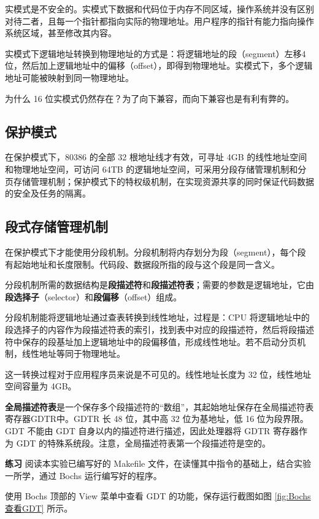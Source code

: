 实模式是不安全的。实模式下数据和代码位于内存不同区域，操作系统并没有区别对待二者，且每一个指针都指向实际的物理地址。用户程序的指针有能力指向操作系统区域，甚至修改其内容。

实模式下逻辑地址转换到物理地址的方式是：将逻辑地址的段（segment）左移4位，然后加上逻辑地址中的偏移（offset），即得到物理地址。实模式下，多个逻辑地址可能被映射到同一物理地址。

为什么 16 位实模式仍然存在？为了向下兼容，而向下兼容也是有利有弊的。

\subsection{保护模式}

在保护模式下，80386 的全部 32 根地址线才有效，可寻址 4GB 的线性地址空间和物理地址空间，可访问 64TB 的逻辑地址空间，可采用分段存储管理机制和分页存储管理机制；保护模式下的特权级机制，在实现资源共享的同时保证代码数据的安全及任务的隔离。

\subsection{段式存储管理机制}

在保护模式下才能使用分段机制。分段机制将内存划分为段（segment），每个段有起始地址和长度限制。代码段、数据段所指的段与这个段是同一含义。

分段机制所需的数据结构是\textbf{段描述符}和\textbf{段描述符表}；需要的参数是逻辑地址，它由\textbf{段选择子}（selector）和\textbf{段偏移}（offset）组成。

分段机制能将逻辑地址通过查表转换到线性地址，过程是：CPU 将逻辑地址中的段选择子的内容作为段描述符表的索引，找到表中对应的段描述符，然后将段描述符中保存的段基址加上逻辑地址中的段偏移值，形成线性地址。若不启动分页机制，线性地址等同于物理地址。

这一转换过程对于应用程序员来说是不可见的。线性地址长度为 32 位，线性地址空间容量为 4GB。

\textbf{全局描述符表}是一个保存多个段描述符的“数组”，其起始地址保存在全局描述符表寄存器GDTR中。GDTR 长 48 位，其中高 32 位为基地址，低 16 位为段界限。GDT 不能由 GDT 自身以内的描述符进行描述，因此处理器将 GDTR 寄存器作为 GDT 的特殊系统段。注意，全局描述符表第一个段描述符是空的。

\begin{mdframed}[hidealllines=true,backgroundcolor=gray!20]
\textbf{练习 }阅读本实验已编写好的 Makefile 文件，在读懂其中指令的基础上，结合实验一所学，通过 Bochs 运行编写好的程序。

使用 Bochs 顶部的 View 菜单中查看 GDT 的功能，保存运行截图如图 \ref{fig:Bochs查看GDT} 所示。

\end{mdframed}

